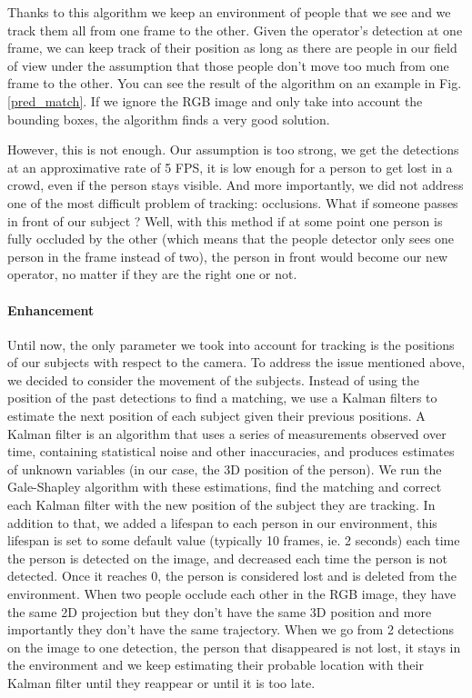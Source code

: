 \documentclass[a4paper, twocolumn]{article}
\begin{document}
    Thanks to this algorithm we keep an environment of people that we see and we track them all from one frame to the other. Given the operator's detection at one frame, we can keep track of their position as long as there are people in our field of view under the assumption that those people don't move too much from one frame to the other. You can see the result of the algorithm on an example in Fig. \ref{pred_match}. If we ignore the RGB image and only take into account the bounding boxes, the algorithm finds a very good solution.

    However, this is not enough. Our assumption is too strong, we get the detections at an approximative rate of 5 FPS, it is low enough for a person to get lost in a crowd, even if the person stays visible. And more importantly, we did not address one of the most difficult problem of tracking: occlusions. What if someone passes in front of our subject ? Well, with this method if at some point one person is fully occluded by the other (which means that the people detector only sees one person in the frame instead of two), the person in front would become our new operator, no matter if they are the right one or not.

    \paragraph{Enhancement} Until now, the only parameter we took into account for tracking is the positions of our subjects with respect to the camera. To address the issue mentioned above, we decided to consider the movement of the subjects. Instead of using the position of the past detections to find a matching, we use a Kalman filters to estimate the next position of each subject given their previous positions. A Kalman filter is an algorithm that uses a series of measurements observed over time, containing statistical noise and other inaccuracies, and produces estimates of unknown variables (in our case, the 3D position of the person). We run the Gale-Shapley algorithm with these estimations, find the matching and correct each Kalman filter with the new position of the subject they are tracking. In addition to that, we added a lifespan to each person in our environment, this lifespan is set to some default value (typically 10 frames, ie. 2 seconds) each time the person is detected on the image, and decreased each time the person is not detected. Once it reaches 0, the person is considered lost and is deleted from the environment. When two people occlude each other in the RGB image, they have the same 2D projection but they don't have the same 3D position and more importantly they don't have the same trajectory. When we go from 2 detections on the image to one detection, the person that disappeared is not lost, it stays in the environment and we keep estimating their probable location with their Kalman filter until they reappear or until it is too late.\\
\end{document}
